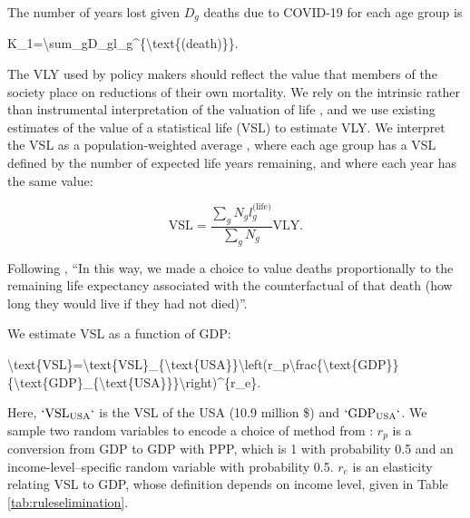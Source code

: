 \documentclass[
]{article}
\newenvironment{Shaded}{\begin{snugshade}}{\end{snugshade}}
\newcommand{\NormalTok}[1]{#1}
\begin{document}
The number of years lost given \(D_g\) deaths due to COVID-19 for each age group is

\begin{Shaded}
\begin{Highlighting}[]
\NormalTok{K\_1=\textbackslash{}sum\_gD\_gl\_g\^{}\{\textbackslash{}text\{(death)\}\}.}
\end{Highlighting}
\end{Shaded}

The VLY used by policy makers should reflect the value that members of the society place on reductions of their own mortality.
We rely on the intrinsic rather than instrumental interpretation of the valuation of life \citep{Cutler2020}, and we use existing estimates of the value of a statistical life (VSL) to estimate VLY. We interpret the VSL as a population-weighted average \citep{Ananthapavan2021, Robinson2021}, where each age group has a VSL defined by the number of expected life years remaining, and where each year has the same value:

\begin{equation}
\text{VSL}=\frac{\sum_gN_gl_g^{\text{(life)}}}{\sum_gN_g}\text{VLY}.
\end{equation}

Following \citet{TheGlobalFund2022}, ``In this way, we made a choice to value deaths proportionally to the remaining life expectancy associated with the counterfactual of that death (how long they would live if they had not died)''.

We estimate VSL as a function of GDP:

\begin{Shaded}
\begin{Highlighting}[]
\NormalTok{\textbackslash{}text\{VSL\}=\textbackslash{}text\{VSL\}\_\{\textbackslash{}text\{USA\}\}\textbackslash{}left(r\_p\textbackslash{}frac\{\textbackslash{}text\{GDP\}\}\{\textbackslash{}text\{GDP\}\_\{\textbackslash{}text\{USA\}\}\}\textbackslash{}right)\^{}\{r\_e\}.}
\end{Highlighting}
\end{Shaded}

Here, \(`\text{VSL}_{\text{USA}}`\) is the VSL of the USA (10.9 million \$) and \(`\text{GDP}_{\text{USA}}`\). We sample two random variables to encode a choice of method from \citet{Robinson2021}: \(r_p\) is a conversion from GDP to GDP with PPP, which is 1 with probability 0.5 and an income-level--specific random variable with probability 0.5. \(r_e\) is an elasticity relating VSL to GDP, whose definition depends on income level, given in Table \ref{tab:ruleselimination}.
\end{document}
